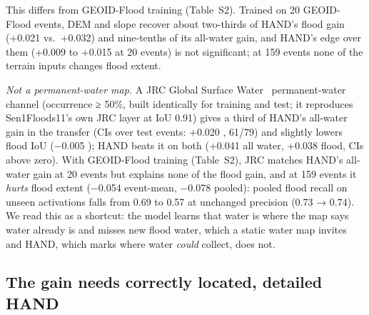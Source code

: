 This differs from GEOID-Flood training (Table~S2). Trained on 20 GEOID-Flood events, DEM and slope recover
about two-thirds of HAND's flood gain (+0.021 vs.\ +0.032) and nine-tenths of its all-water gain, and HAND's
edge over them (+0.009 to +0.015 at 20 events) is not significant; at 159 events none of the terrain inputs changes flood
extent.

\emph{Not a permanent-water map.} A JRC Global Surface Water~\cite{pekel2016gsw} permanent-water channel
(occurrence ≥ 50\%, built identically for training and test; it reproduces Sen1Floods11's own JRC layer
at IoU 0.91) gives a third of HAND's all-water gain in the transfer (CIs over test events: +0.020 , 61/79)
and slightly lowers flood IoU (−0.005 ); HAND beats it on both (+0.041 all water,
+0.038 flood, CIs above zero). With GEOID-Flood training (Table~S2),
JRC matches HAND's all-water gain at 20 events but explains none of the flood gain, and at 159 events it
\emph{hurts} flood extent (−0.054  event-mean, −0.078 pooled): pooled flood recall on
unseen activations falls from 0.69 to 0.57 at unchanged precision (0.73 → 0.74). We read this as a shortcut:
the model learns that water is where the map says water already is and misses new flood water, which a
static water map invites and HAND, which marks where water \emph{could} collect, does not.

\subsection{The gain needs correctly located, detailed HAND}
\label{sec:mechanism}

\begin{table}[t]
\caption{HAND gain over SAR only when the HAND input is perturbed (pre-registered; Sen1Floods11-trained
U-Net, 3 seeds; all 77/79 GEOID-Flood test events; event-mean IoU, two-way 95\% CIs). Scored pixels are
identical in every row.}
\label{tab:mechanism}
\centering
{}
\end{table}

